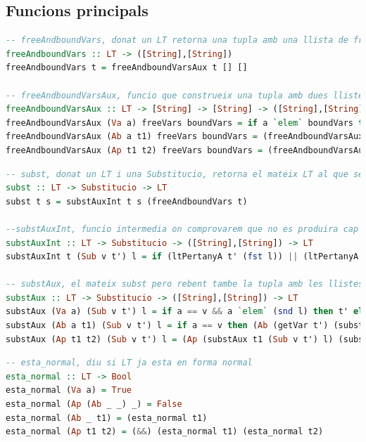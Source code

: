 \documentclass[10pt,a4paper]{article}
\begin{document}
\subsection{Funcions principals}

\begin{lstlisting}[language=Haskell]
-- freeAndboundVars, donat un LT retorna una tupla amb una llista de freeVars i una llista de boundVars
freeAndboundVars :: LT -> ([String],[String])
freeAndboundVars t = freeAndboundVarsAux t [] []

-- freeAndboundVarsAux, funcio que construeix una tupla amb dues llistes que continguin les variables lliures (first) i lligades (second)
freeAndboundVarsAux :: LT -> [String] -> [String] -> ([String],[String])
freeAndboundVarsAux (Va a) freeVars boundVars = if a `elem` boundVars then (freeVars,boundVars) else (a:freeVars,boundVars)
freeAndboundVarsAux (Ab a t1) freeVars boundVars = (freeAndboundVarsAux t1 freeVars (a:boundVars))
freeAndboundVarsAux (Ap t1 t2) freeVars boundVars = (freeAndboundVarsAux t1 freeVars boundVars) `concatTuples` (freeAndboundVarsAux t2 freeVars boundVars)
\end{lstlisting}



\begin{lstlisting}[language=Haskell]
-- subst, donat un LT i una Substitucio, retorna el mateix LT al que se li ha aplicat la Substitucio
subst :: LT -> Substitucio -> LT
subst t s = substAuxInt t s (freeAndboundVars t)

--substAuxInt, funcio intermedia on comprovarem que no es produira cap captura de cap variable lliure
substAuxInt :: LT -> Substitucio -> ([String],[String]) -> LT
substAuxInt t (Sub v t') l = if (ltPertanyA t' (fst l)) || (ltPertanyA t' (snd l)) then t else substAux t (Sub v t') l

-- substAux, el mateix subst pero rebent tambe la tupla amb les llistes de variables lliures i lligades
substAux :: LT -> Substitucio -> ([String],[String]) -> LT
substAux (Va a) (Sub v t') l = if a == v && a `elem` (snd l) then t' else (Va a)
substAux (Ab a t1) (Sub v t') l = if a == v then (Ab (getVar t') (substAux t1 (Sub v t') l)) else (Ab a (substAux t1 (Sub v t') l))
substAux (Ap t1 t2) (Sub v t') l = (Ap (substAux t1 (Sub v t') l) (substAux t2 (Sub v t') l))
\end{lstlisting}



\begin{lstlisting}[language=Haskell]
-- esta_normal, diu si LT ja esta en forma normal
esta_normal :: LT -> Bool
esta_normal (Va a) = True
esta_normal (Ap (Ab _ _) _) = False
esta_normal (Ab _ t1) = (esta_normal t1)
esta_normal (Ap t1 t2) = (&&) (esta_normal t1) (esta_normal t2)
\end{lstlisting}
\end{document}

